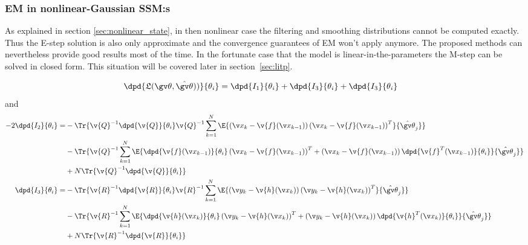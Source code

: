 \subsubsection{EM in nonlinear-Gaussian SSM:s}%

As explained in section \ref{sec:nonlinear_state}, in then nonlinear case
the filtering and smoothing distributions cannot be computed exactly.
Thus the E-step solution is also only approximate and the convergence
guarantees of EM won't apply anymore. The proposed methods can nevertheless
provide good results most of the time. In the fortunate case that the
model is linear-in-the-parameters the M-step can be solved in closed form.
This situation will be covered later in section~\ref{sec:litp}.

\begin{align}
	\dpd{\Lb(\Th,\hat{\Th}))}{\theta_i}&=\dpd{I_1}{\theta_i}+\dpd{I_3}{\theta_i}+\dpd{I_3}{\theta_i}
	\label{eq:dLB_nonlinear_1}
\end{align}
and
\begin{align}
\begin{split}
	-2\dpd{I_2}{\theta_i}
	=&-\Tr{\v{Q}^{-1}\dpd{\v{Q}}{\theta_i}\v{Q}^{-1}
	\sum_{k=1}^N\E{\left(\x_k-\v{f}(\x_{k-1})\right)\left(\x_k-\v{f}(\x_{k-1})\right)^T}{\hat{\Th}_j}}\\
	&-\Tr{\v{Q}^{-1}\sum_{k=1}^N\E{\dpd{\v{f}(\x_{k-1})}{\theta_i}\left(\x_k-\v{f}(\x_{k-1})\right)^T+\left(\x_k-\v{f}(\x_{k-1})\right)\dpd{\v{f}^T(\x_{k-1})}{\theta_i}}{\hat{\Th}_j}}\\
	&+N\Tr{\v{Q}^{-1}\dpd{\v{Q}}{\theta_i}}\\
	\dpd{I_3}{\theta_i}=&
	-\Tr{\v{R}^{-1}\dpd{\v{R}}{\theta_i}\v{R}^{-1}
	\sum_{k=1}^N\E{\left(\y_k-\v{h}(\x_{k})\right)\left(\y_k-\v{h}(\x_{k})\right)^T}{\hat{\Th}_j}}\\
	&-\Tr{\v{R}^{-1}\sum_{k=1}^N\E{\dpd{\v{h}(\x_{k})}{\theta_i}\left(\y_k-\v{h}(\x_{k})\right)^T+\left(\y_k-\v{h}(\x_{k})\right)\dpd{\v{h}^T(\x_{k})}{\theta_i}}{\hat{\Th}_j}}\\
	&+N\Tr{\v{R}^{-1}\dpd{\v{R}}{\theta_i}}\\
	\label{eq:dLB_nonlinear}
\end{split}
\end{align}



